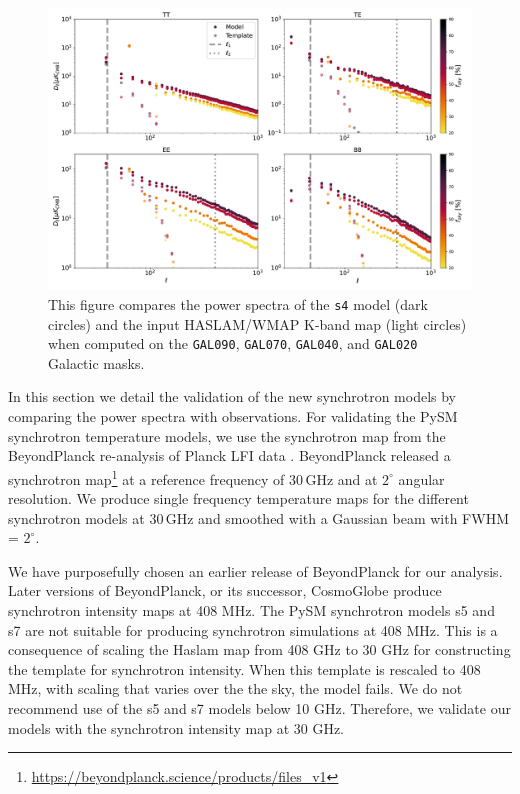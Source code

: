\documentclass[twocolumn]{aastex631}
\begin{document}
\begin{figure}
    \centering
    \includegraphics[width=2.\columnwidth]{figures/synch_valspectra.pdf}
    \caption{This figure compares the power spectra of the \texttt{s4} model (dark circles) and the input HASLAM/WMAP K-band  map (light circles) when computed on the \texttt{GAL090}, \texttt{GAL070}, \texttt{GAL040}, and \texttt{GAL020} Galactic masks.}
    \label{fig:spectra_by_field}
\end{figure}
In this section we detail the validation of the new synchrotron models by comparing the power spectra with observations. For validating the PySM synchrotron temperature models, we use the synchrotron map from the BeyondPlanck re-analysis of Planck LFI data \citep{Andersen:2023}. BeyondPlanck released a synchrotron map\footnote{\url{https://beyondplanck.science/products/files\_v1}} at a reference frequency of 30\,GHz and at $2^\circ$ angular resolution. We produce single frequency temperature maps for the different synchrotron models at 30\,GHz and smoothed with a Gaussian beam with FWHM = $2^\circ$.

We have purposefully chosen an earlier release of BeyondPlanck for our analysis. Later versions of BeyondPlanck, or its successor, CosmoGlobe produce synchrotron intensity maps at 408 MHz. The PySM synchrotron models s5 and s7 are not suitable for producing synchrotron simulations at 408 MHz. This is a consequence of scaling the Haslam map from 408 GHz to 30 GHz for constructing the template for synchrotron intensity. When this template is rescaled to 408 MHz, with scaling that varies over the the sky, the model fails. We do not recommend use of the s5 and s7 models below 10 GHz. Therefore, we validate our models with the synchrotron intensity map at 30 GHz.
\end{document}
